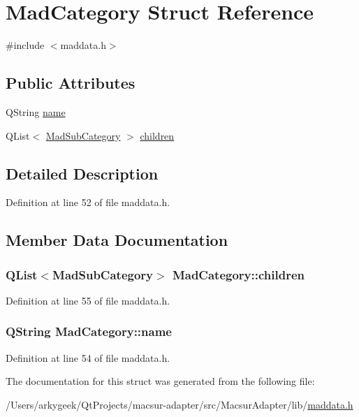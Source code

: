 \hypertarget{struct_mad_category}{\section{Mad\-Category Struct Reference}
\label{struct_mad_category}
}


{\ttfamily \#include $<$maddata.\-h$>$}

\subsection*{Public Attributes}
\begin{DoxyCompactItemize}
\item 
Q\-String \hyperlink{struct_mad_category_af8fe4e8d21720e18b05210a43b2108c2}{name}
\item 
Q\-List$<$ \hyperlink{struct_mad_sub_category}{Mad\-Sub\-Category} $>$ \hyperlink{struct_mad_category_acbabe397fcbe94594e9ee0a3b8c42045}{children}
\end{DoxyCompactItemize}


\subsection{Detailed Description}


Definition at line 52 of file maddata.\-h.



\subsection{Member Data Documentation}
\hypertarget{struct_mad_category_acbabe397fcbe94594e9ee0a3b8c42045}{
\subsubsection[{children}]{\setlength{\rightskip}{0pt plus 5cm}Q\-List$<${\bf Mad\-Sub\-Category}$>$ Mad\-Category\-::children}}\label{struct_mad_category_acbabe397fcbe94594e9ee0a3b8c42045}


Definition at line 55 of file maddata.\-h.

\hypertarget{struct_mad_category_af8fe4e8d21720e18b05210a43b2108c2}{
\subsubsection[{name}]{\setlength{\rightskip}{0pt plus 5cm}Q\-String Mad\-Category\-::name}}\label{struct_mad_category_af8fe4e8d21720e18b05210a43b2108c2}


Definition at line 54 of file maddata.\-h.



The documentation for this struct was generated from the following file\-:\begin{DoxyCompactItemize}
\item 
/\-Users/arkygeek/\-Qt\-Projects/macsur-\/adapter/src/\-Macsur\-Adapter/lib/\hyperlink{maddata_8h}{maddata.\-h}\end{DoxyCompactItemize}
